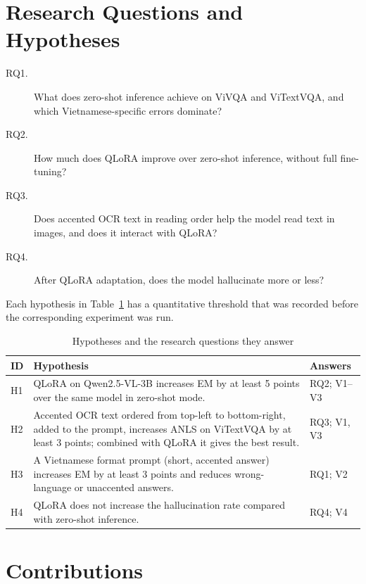 \section{Research Questions and Hypotheses}
\label{sec:intro-rq}

\begin{description}
  \item[RQ1.] What does zero-shot inference achieve on ViVQA and ViTextVQA, and
  which Vietnamese-specific errors dominate?
  \item[RQ2.] How much does QLoRA improve over zero-shot inference, without full
  fine-tuning?
  \item[RQ3.] Does accented OCR text in reading order help the model read text in
  images, and does it interact with QLoRA?
  \item[RQ4.] After QLoRA adaptation, does the model hallucinate more or less?
\end{description}

Each hypothesis in Table~\ref{tab:hypotheses} has a quantitative threshold that
was recorded before the corresponding experiment was run.

\begin{table}[htbp]
\caption{Hypotheses and the research questions they answer}
\label{tab:hypotheses}
\centering
\small
\begin{tabular}{p{}p{}p{}}
\toprule
\textbf{ID} & \textbf{Hypothesis} & \textbf{Answers} \\
\midrule
H1 & QLoRA on Qwen2.5-VL-3B increases EM by at least 5 points over the same model
in zero-shot mode. & RQ2; V1--V3 \\
H2 & Accented OCR text ordered from top-left to bottom-right, added to the
prompt, increases ANLS on ViTextVQA by at least 3 points; combined with QLoRA it
gives the best result. & RQ3; V1, V3 \\
H3 & A Vietnamese format prompt (short, accented answer) increases EM by at
least 3 points and reduces wrong-language or unaccented answers. & RQ1; V2 \\
H4 & QLoRA does not increase the hallucination rate compared with zero-shot
inference. & RQ4; V4 \\
\bottomrule
\end{tabular}
\end{table}

\section{Contributions}
\label{sec:intro-contrib}

